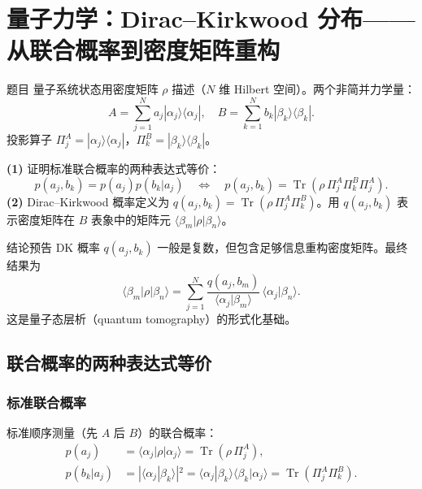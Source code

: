 \section{量子力学：Dirac--Kirkwood 分布——从联合概率到密度矩阵重构}

\begin{modelbox}{题目}
量子系统状态用密度矩阵 $\rho$ 描述（$N$ 维 Hilbert 空间）。两个非简并力学量：
\[
  A=\sum_{j=1}^N a_j|\alpha_j\rangle\langle\alpha_j|,
  \quad B=\sum_{k=1}^N b_k|\beta_k\rangle\langle\beta_k|.
\]
投影算子 $\Pi_j^A=|\alpha_j\rangle\langle\alpha_j|$，$\Pi_k^B=|\beta_k\rangle\langle\beta_k|$。

\textbf{(1)} 证明标准联合概率的两种表达式等价：
\[
  p(a_j,b_k)=p(a_j)p(b_k|a_j)
  \quad\Longleftrightarrow\quad
  p(a_j,b_k)=\operatorname{Tr}(\rho\,\Pi_j^A\Pi_k^B\Pi_j^A).
\]
\textbf{(2)} Dirac--Kirkwood 概率定义为 $q(a_j,b_k)=\operatorname{Tr}(\rho\,\Pi_j^A\Pi_k^B)$。用 $q(a_j,b_k)$ 表示密度矩阵在 $B$ 表象中的矩阵元 $\langle\beta_m|\rho|\beta_n\rangle$。
\end{modelbox}

\vspace{0.3em}
\begin{insightbox}{结论预告}
DK 概率 $q(a_j,b_k)$ 一般是复数，但包含足够信息重构密度矩阵。最终结果为
\[
  \langle\beta_m|\rho|\beta_n\rangle = \sum_{j=1}^N \frac{q(a_j,b_m)}{\langle\alpha_j|\beta_m\rangle}\,\langle\alpha_j|\beta_n\rangle.
\]
这是量子态层析（quantum tomography）的形式化基础。
\end{insightbox}


\subsection{联合概率的两种表达式等价}

\subsubsection{标准联合概率}

标准顺序测量（先 $A$ 后 $B$）的联合概率：
\begin{align*}
  p(a_j) &= \langle\alpha_j|\rho|\alpha_j\rangle = \operatorname{Tr}(\rho\,\Pi_j^A), \\
  p(b_k|a_j) &= |\langle\alpha_j|\beta_k\rangle|^2 = \langle\alpha_j|\beta_k\rangle\langle\beta_k|\alpha_j\rangle = \operatorname{Tr}(\Pi_j^A\Pi_k^B).
\end{align*}

